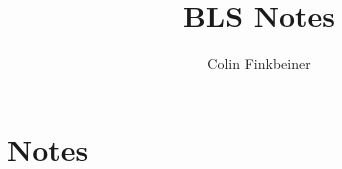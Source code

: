 \documentclass{article}
\begin{document}
\title{BLS Notes}
\author{Colin Finkbeiner}
\maketitle

\section{Notes}
\end{document}

